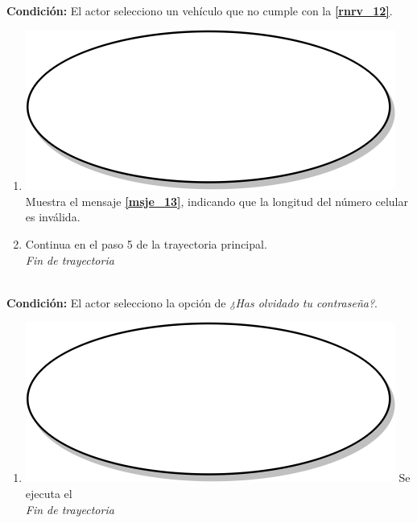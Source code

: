 \textbf{}\\
\textbf{Condición:} El actor selecciono un vehículo que no cumple con la \textbf{\ref{rnrv_12}}.\\
 \begin{enumerate}[label=M\arabic*]
    \item {\includegraphics[scale=.05]{Capitulo3/img/proceso.png} Muestra el mensaje \textbf{\ref{msje_13}}, indicando que la longitud del número celular es inválida.}
    \item {Continua en el paso 5 de la trayectoria principal.} \\
    \textit{Fin de trayectoria} \\
\end{enumerate}

\textbf{}\\
\textbf{Condición:} El actor selecciono la opción de \textit{¿Has olvidado tu contraseña?}.\\
 \begin{enumerate}[label=N\arabic*]
    \item {\includegraphics[scale=.05]{Capitulo3/img/proceso.png} Se ejecuta el } \\
    \textit{Fin de trayectoria} \\
\end{enumerate}

